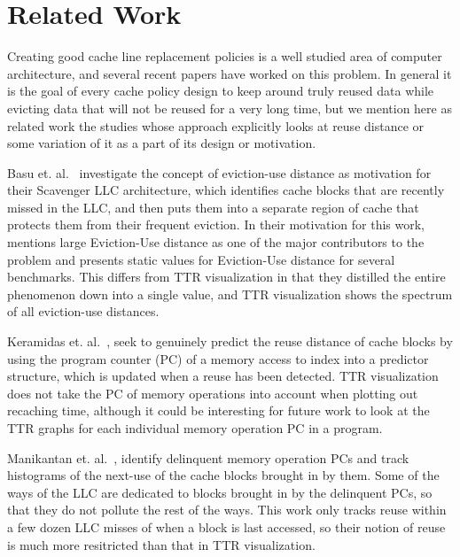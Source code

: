 \section{Related Work}
Creating good cache line replacement policies is a well
studied area of computer architecture, and several recent papers have
worked on this problem.  In general it is the goal of every cache
policy design to keep around truly reused data while evicting data
that will not be reused for a very long time, but we mention here as
related work the
studies whose approach explicitly looks at reuse distance or some
variation of it as a part of its design or motivation.

Basu et. al.~\cite{basukirman07} investigate the concept of eviction-use distance
as motivation for their Scavenger LLC architecture, which identifies
cache blocks that are recently missed in the LLC, and then puts them
into a separate region of cache that protects them from their frequent
eviction.  In their motivation for this work,
mentions large Eviction-Use distance as one of the major contributors
to the problem and presents static values for Eviction-Use distance
for several benchmarks.  This differs from TTR visualization in that
they distilled the entire phenomenon down into a single value, and
TTR visualization shows the spectrum of all eviction-use distances.

Keramidas et. al.~\cite{keramidaspetoumenos07}, seek to genuinely predict the reuse
distance of cache blocks by using the program counter (PC) of a memory
access to index into a predictor structure, which is updated when a
reuse has been detected.  TTR visualization does not take the PC of
memory operations into account when plotting out recaching time,
although it could be interesting for future work to look at the TTR
graphs for each individual memory operation PC in a program.

Manikantan et. al.~\cite{manikantanrajan11}, identify delinquent memory operation PCs
and track
histograms of the next-use of the cache blocks brought in by them.
Some of the ways of the LLC are dedicated to blocks brought in by the
delinquent PCs, so that they do not pollute the rest of the ways.
This work only tracks reuse within a few dozen LLC misses of when a
block is last accessed, so their notion of reuse is much more
resitricted than that in TTR visualization.

